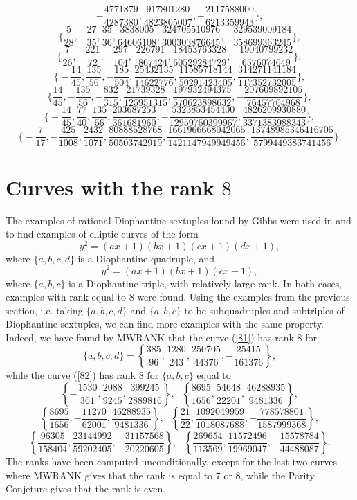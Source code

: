 \documentclass [11pt] {article}
\begin{document}
{$$-\frac{4771879}{4287380}, \frac{917801280}{4823805007}, -\frac{2117588000}{6213359943} \Big\}, $$
$$ \Big\{ \frac{5}{28}, -\frac{27}{35}, \frac{35}{36}, \frac{3838005}{64606108},
\frac{324705510976}{300303876645}, -\frac{329539009184}{358699363245} \Big\}, $$
$$ \Big\{ \frac{7}{26}, -\frac{221}{72}, -\frac{297}{104},
\frac{226791}{1867424}, \frac{18453763328}{60529284729}, -\frac{19040799232}{6576074649} \Big\}, $$
$$ \Big\{ -\frac{14}{45}, \frac{135}{56}, -\frac{185}{504}, \frac{25432135}{14622776},
\frac{11585718144}{50291423405}, \frac{314271141184}{117352732005} \Big\}, $$
$$ \Big\{ \frac{14}{45}, -\frac{135}{56}, -\frac{832}{315}, \frac{21739328}{125951315},
\frac{197932494375}{570623898632}, -\frac{207609892105}{76457704968} \Big\}, $$
$$ \Big\{ -\frac{14}{45}, \frac{77}{40}, \frac{135}{56}, \frac{203687253}{361681960},
-\frac{5323853454400}{12959750399967}, \frac{4826209930880}{3371383988343} \Big\}, $$
$$ \Big\{ -\frac{7}{17}, -\frac{425}{1008}, \frac{2432}{1071},
\frac{80888528768}{50503742919}, \frac{1661966668042065}{1421147949949456},
\frac{13748985346416705}{5799449383741456} \Big\}. $$

}

\section{Curves with the rank $8$}

The examples of rational Diophantine sextuples found by Gibbs were used in
\cite{D-irr} and \cite{D-mw} to find examples of elliptic curves
of the form
\begin{equation} \label{81}
y^2= (ax+1)(bx+1)(cx+1)(dx+1),
\end{equation}
where $\{a,b,c,d\}$ is a Diophantine quadruple,
and
\begin{equation} \label{82}
y^2= (ax+1)(bx+1)(cx+1),
\end{equation}
where $\{a,b,c\}$ is a Diophantine triple, with relatively large rank.
In both cases, examples with rank equal to $8$
were found. Using the examples from the previous section, i.e. taking
$\{a,b,c,d\}$ and $\{a,b,c\}$ to be subquadruples and subtriples of Diophantine
sextuples, we can find more examples
with the same property. Indeed, we have found by MWRANK that the curve (\ref{81}) has rank $8$ for
$$ \{a,b,c,d\} = \left\{\frac{385}{96}, \frac{1280}{243},
\frac{250705}{44376}, -\frac{25415}{161376} \right\}, $$
while the curve (\ref{82}) has rank $8$ for $\{a,b,c\}$ equal to
$$ \left\{ -\frac{1530}{361}, \frac{2088}{9245}, \frac{399245}{2889816} \right\},  \,\,\,\,
 \left\{ \frac{8695}{1656}, \frac{54648}{22201}, \frac{46288935}{9481336} \right\}, $$
$$ \left\{ \frac{8695}{1656}, -\frac{11270}{62001}, \frac{46288935}{9481336} \right\}, \,\,\,\,
 \left\{ \frac{21}{22}, \frac{1092049959}{1018087688}, -\frac{778578801}{1587999368} \right\}, $$
$$ \left\{ \frac{96305}{158404}, \frac{23144992}{59202405}, -\frac{31157568}{20220605} \right\}, \,\,\,\,
 \left\{ \frac{269654}{113569}, \frac{11572496}{19969047}, -\frac{15578784}{44488087} \right\}. $$
The ranks have been computed unconditionally, except for the last two curves where MWRANK gives
that the rank is equal to $7$ or $8$, while the Parity Conjeture gives that the rank is even.
\end{document}
